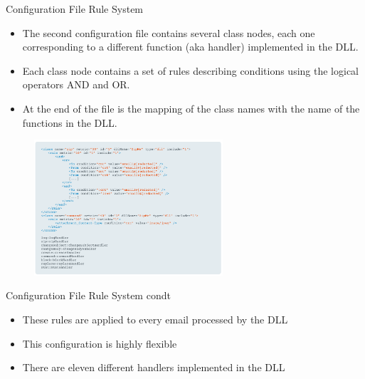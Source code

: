 \begin{frame}[fragile]{Configuration File Rule System}
    \begin{itemize}
        \item The second configuration file contains several class nodes, each one corresponding to a different function 
        (aka handler) implemented in the DLL. 
        \item Each class node contains a set of rules describing conditions using the logical operators AND and OR. 
        \item At the end of the file is the mapping of the class names with the name of the functions in the DLL.
    \end{itemize}
    \begin{figure}
        \includegraphics[width=7cm]{figures/rule_file.PNG}
    \end{figure}
\end{frame}

\begin{frame}[fragile]{Configuration File Rule System condt}
    \begin{itemize}
        \item These rules are applied to every email processed by the DLL
        \item This configuration is highly flexible
        \item There are eleven different handlers implemented in the DLL 
    \end{itemize}
\end{frame}